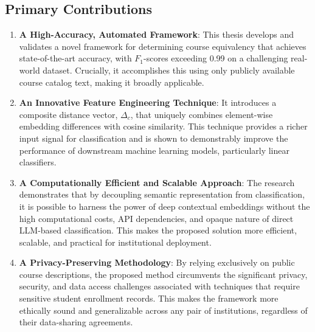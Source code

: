 \begin{introduction}
\subsection{Primary Contributions}
\begin{enumerate}
\item \textbf{A High-Accuracy, Automated Framework}: This thesis develops and validates a novel framework for determining course equivalency that achieves state-of-the-art accuracy, with \(F_1\)-scores exceeding 0.99 on a challenging real-world dataset. Crucially, it accomplishes this using only publicly available course catalog text, making it broadly applicable.
\item \textbf{An Innovative Feature Engineering Technique}: It introduces a composite distance vector, \(\Delta_c\), that uniquely combines element-wise embedding differences with cosine similarity. This technique provides a richer input signal for classification and is shown to demonstrably improve the performance of downstream machine learning models, particularly linear classifiers.
\item \textbf{A Computationally Efficient and Scalable Approach}: The research demonstrates that by decoupling semantic representation from classification, it is possible to harness the power of deep contextual embeddings without the high computational costs, API dependencies, and opaque nature of direct LLM-based classification. This makes the proposed solution more efficient, scalable, and practical for institutional deployment.
\item \textbf{A Privacy-Preserving Methodology}: By relying exclusively on public course descriptions, the proposed method circumvents the significant privacy, security, and data access challenges associated with techniques that require sensitive student enrollment records. This makes the framework more ethically sound and generalizable across any pair of institutions, regardless of their data-sharing agreements.
\end{enumerate}


\end{introduction}
